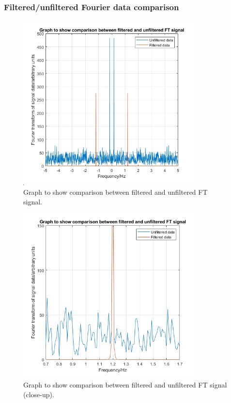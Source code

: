 \documentclass[11pt]{article}
\numberwithin{equation}{section}
\begin{document}
\subsubsection{Filtered/unfiltered Fourier data comparison}

\begin{figure}[H]
    \centering
    \includegraphics[height = 9cm]{./img/q304b.png}
    \caption{Graph to show comparison between filtered and unfiltered FT signal.}
    \label{fig:q304b}
\end{figure}
\begin{figure}[H]
    \centering
    \includegraphics[height = 9cm]{./img/q304b2.png}
    \caption{Graph to show comparison between filtered and unfiltered FT signal (close-up).}
    \label{fig:q304b}
\end{figure}
\end{document}
